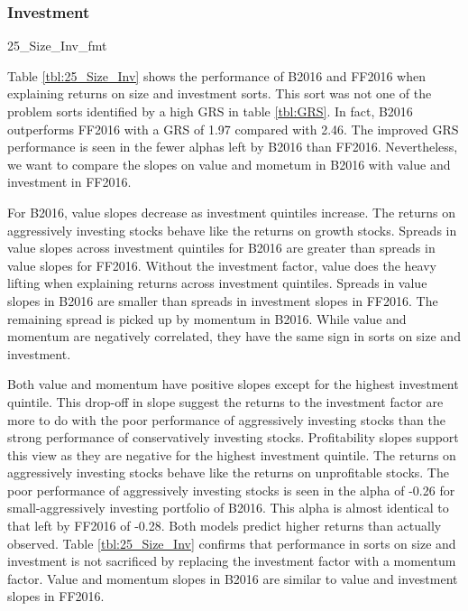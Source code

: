 
\subsubsection{Investment}

{25_Size_Inv_fmt}

Table \ref{tbl:25_Size_Inv} shows the performance of B2016 and FF2016 when explaining
returns on size and investment sorts. This sort was not one of the problem sorts
identified by a high GRS in table \ref{tbl:GRS}. In fact, B2016 outperforms FF2016 with a
GRS of 1.97 compared with 2.46. The improved GRS performance is seen in the fewer alphas
left by B2016 than FF2016. Nevertheless, we want to compare the slopes on value and
mometum in B2016 with value and investment in FF2016.

For B2016, value slopes decrease as investment quintiles increase. The returns on
aggressively investing stocks behave like the returns on growth stocks. Spreads in value
slopes across investment quintiles for B2016 are greater than spreads in value slopes for
FF2016. Without the investment factor, value does the heavy lifting when explaining
returns across investment quintiles. Spreads in value slopes in B2016 are smaller than
spreads in investment slopes in FF2016. The remaining spread is picked up by momentum in
B2016. While value and momentum are negatively correlated, they have the same sign in
sorts on size and investment.

Both value and momentum have positive slopes except for the highest investment quintile.
This drop-off in slope suggest the returns to the investment factor are more to do with
the poor performance of aggressively investing stocks than the strong performance of
conservatively investing stocks. Profitability slopes support this view as they are
negative for the highest investment quintile. The returns on aggressively investing stocks
behave like the returns on unprofitable stocks. The poor performance of aggressively
investing stocks is seen in the alpha of -0.26 for small-aggressively investing portfolio
of B2016. This alpha is almost identical to that left by FF2016 of -0.28. Both models
predict higher returns than actually observed. Table \ref{tbl:25_Size_Inv} confirms that
performance in sorts on size and investment is not sacrificed by replacing the investment
factor with a momentum factor. Value and momentum slopes in B2016 are similar to value and
investment slopes in FF2016.

